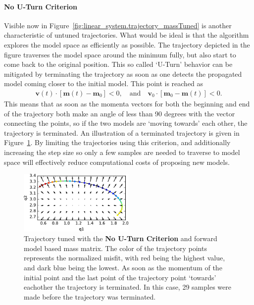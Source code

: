 \paragraph{No U-Turn Criterion}Visible now in Figure~\ref{fig:linear_system.trajectory_massTuned} is another characteristic of untuned trajectories. What would be ideal is that the algorithm explores the model space as efficiently as possible. The trajectory depicted in the figure traverses the model space around the minimum fully, but also start to come back to the original position. This so called `U-Turn' behavior can be mitigated by terminating the trajectory as soon as one detects the propagated model coming closer to the initial model. This point is reached as
\begin{gather}
	  \mathbf{v}(t) \cdot \left[ \mathbf{m}(t) - \mathbf{m}_0 \right] < 0, \quad
	 \text{and} \quad
	 \mathbf{v}_0\cdot \left[ \mathbf{m}_0 - \mathbf{m}(t) \right] < 0.
\end{gather}
This means that as soon as the momenta vectors for both the beginning and end of the trajectory both make an angle of less than 90 degrees with the vector connecting the points, so if the two models are `moving towards' each other, the trajectory is terminated. An illustration of a terminated trajectory is given in Figure~\ref{fig:linear_system.trajectory_uTurn}. By limiting the trajectories using this criterion, and additionally increasing the step size so only a few samples are needed to traverse to model space will effectively reduce computational costs of proposing new models.

\begin{figure}
	\centering
	
	\includegraphics[width=0.5\textwidth]{simple-linear-system/figures/trajectory_uTurn_29_samples}
	
	\caption{Trajectory tuned with the \textbf{No U-Turn Criterion} and forward model based mass matrix. The color of the trajectory points represents the normalized misfit, with red being the highest value, and dark blue being the lowest. As soon as the momentum of the initial point and the last point of the trajectory point `towards' eachother the trajectory is terminated. In this case, 29 samples were made before the trajectory was terminated.}
	\label{fig:linear_system.trajectory_uTurn}
\end{figure}

